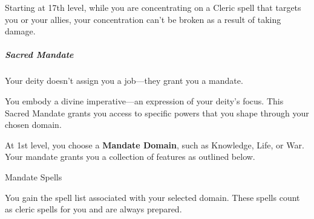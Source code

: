Starting at 17th level, while you are concentrating on a Cleric spell
that targets you or your allies, your concentration can't be broken as a
result of taking damage.

\subparagraph{Sacred Mandate}\label{_sacred_mandate}

Your deity doesn't assign you a job---they grant you a mandate.

You embody a divine imperative---an expression of your deity's focus.
This Sacred Mandate grants you access to specific powers that you shape
through your chosen domain.

At 1st level, you choose a \textbf{Mandate Domain}, such as Knowledge,
Life, or War. Your mandate grants you a collection of features as
outlined below.

Mandate Spells

You gain the spell list associated with your selected domain. These
spells count as cleric spells for you and are always prepared.

